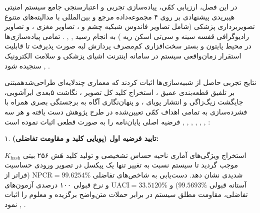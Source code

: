 


در این فصل، ارزیابی کمّی، پیاده‌سازی تجربی و اعتبارسنجی جامع سیستم امنیتی هیبریدی پیشنهادی بر روی ۴ مجموعه‌داده مرجع و بین‌المللی با مدالیته‌های متنوع تصویربرداری پزشکی (شامل تصاویر فاندوس شبکیه چشم  و ، تصاویر  مغزی ، و تصاویر رادیوگرافی قفسه سینه و سی‌تی اسکن ریه ) به انجام رسید , , . تمامی پیاده‌سازی‌ها در محیط پایتون و بستر سخت‌افزاری کم‌مصرف پردازش لبه  صورت پذیرفت تا قابلیت استقرار زمان‌واقعی سیستم در سامانه اینترنت اشیای پزشکی  و سلامت الکترونیک سنجیده شود , .\par



نتایج تجربی حاصل از شبیه‌سازی‌ها اثبات کردند که معماری چندلایه‌ای طراحی‌شدهمبتنی بر تلفیق قطعه‌بندی عمیق ، استخراج کلید کل تصویر ، نگاشت ۵بعدی ابرآشوبی، جایگشت زیگ‌زاگی و انتشار پویای ، و پنهان‌نگاری آگاه به برجستگی بصری  همراه با فشرده‌سازی به تمامی اهداف کمّی تعیین‌شده در طرح پژوهش دست یافته و هر سه فرضیه اصلی پایان‌نامه را به صورت قطعی اثبات نموده است , , , , , , :\par



۱. \textbf{تایید فرضیه اول (پویایی کلید و مقاومت تفاضلی):}\par

استخراج ویژگی‌های آماری ناحیه حساس تشخیصی  و تولید کلید هَش ۲۵۶ بیتی $K_{\mathrm{hash}}$ موجب گردید تا سیستم نسبت به تغییر تنها یک پیکسل در تصویر ورودی حساسیت شدیدی  نشان دهد. دست‌یابی به شاخص‌های تفاضلی \textbf{$\mathrm{NPCR} = 99.6254\%$} (فراتر از آستانه قبولی $99.5693\%$) و \textbf{$\mathrm{UACI} = 33.5120\%$} و نرخ قبولی ۱۰۰ درصدی آزمون‌های تفاضلی، مقاومت مطلق سیستم در برابر حملات متن‌واضح برگزیده  و معلوم  را اثبات نمود , .\par


